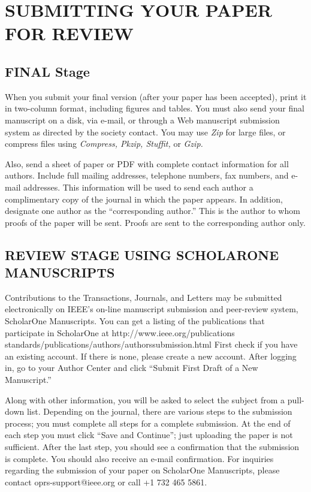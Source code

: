 \section{SUBMITTING YOUR PAPER FOR REVIEW}

\subsection{FINAL Stage}
When you submit your final version (after your paper has been accepted), 
print it in two-column format, including figures and tables. You must also 
send your final manuscript on a disk, via e-mail, or through a Web 
manuscript submission system as directed by the society contact. You may use 
\textit{Zip} for large files, or compress files using \textit{Compress, Pkzip, Stuffit,} or \textit{Gzip.} 

Also, send a sheet of paper or PDF with complete contact information for all 
authors. Include full mailing addresses, telephone numbers, fax numbers, and 
e-mail addresses. This information will be used to send each author a 
complimentary copy of the journal in which the paper appears. In addition, 
designate one author as the ``corresponding author.'' This is the author to 
whom proofs of the paper will be sent. Proofs are sent to the corresponding 
author only.

\subsection{REVIEW STAGE USING SCHOLARONE{\textregistered} MANUSCRIPTS}
Contributions to the Transactions, Journals, and Letters may be submitted 
electronically on IEEE's on-line manuscript submission and peer-review 
system, ScholarOne{\textregistered} Manuscripts. You can get a 
listing of the publications that participate in ScholarOne at 
http://www.ieee.org/\discretionary{}{}{}publications\textunderscore 
standards/publications/authors/authors\textunderscore\break submission.html First 
check if you have an existing account. If there is none, please create a new 
account. After logging in, go to your Author Center and click ``Submit First 
Draft of a New Manuscript.'' 

Along with other information, you will be asked to select the subject from a 
pull-down list. Depending on the journal, there are various steps to the 
submission process; you must complete all steps for a complete submission. 
At the end of each step you must click ``Save and Continue''; just uploading 
the paper is not sufficient. After the last step, you should see a 
confirmation that the submission is complete. You should also receive an 
e-mail confirmation. For inquiries regarding the submission of your paper on 
ScholarOne Manuscripts, please contact oprs-support@ieee.org or call +1 
732 465 5861.

